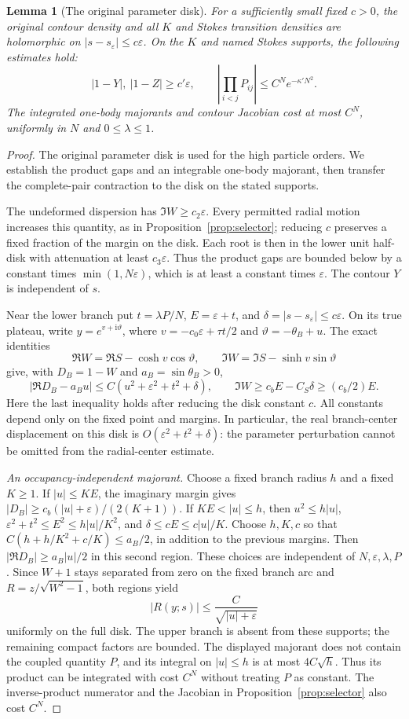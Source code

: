 \documentclass[11pt]{article}
\numberwithin{equation}{section}
\newtheorem{lemma}[theorem]{Lemma}
\theoremstyle{definition}
\newcommand{\ii}{\mathrm i}
\newcommand{\eps}{\varepsilon}
\newcommand{\se}{s_\varepsilon}
\begin{document}
\clearpage
\begin{lemma}[The original parameter disk]\label{lem:originaldisk}
For a sufficiently small fixed \(c>0\), the original contour
density and all \(K\) and Stokes transition densities are holomorphic
on \(|s-s_\eps|\le c\eps\). On the \(K\) and named Stokes
supports, the following estimates hold:
\[
 |1-Y|,\ |1-Z|\ge c'\eps,\qquad
 \left|\prod_{i<j}P_{ij}\right|\le C^Ne^{-\kappa' N^2}.
\]
The integrated one-body majorants and contour Jacobian cost
at most \(C^N\), uniformly in \(N\) and \(0\le\lambda\le1\).
\end{lemma}
\begin{proof}
The original parameter disk is used for the high particle orders. We establish the product gaps and an integrable one-body majorant, then transfer the complete-pair contraction to the disk on the stated supports.

The undeformed dispersion has \(\Im W\ge c_2\eps\).
Every permitted radial motion increases this quantity, as in
Proposition~\ref{prop:selector}; reducing \(c\) preserves a
fixed fraction of the margin on the disk. Each root is then
in the lower unit half-disk with attenuation at least \(c_3\eps\).
Thus the product gaps are bounded below by a constant times
\(\min(1,N\eps)\), which is at least a constant times \(\eps\).
The contour \(Y\) is independent of \(s\).

Near the lower branch put \(t=\lambda P/N\),
\(E=\eps+t\), and \(\delta=|s-\se|\le c\eps\).
On its true plateau, write
\(y=e^{v+\ii\vartheta}\), where
\(v=-c_0\eps+\tau t/2\) and \(\vartheta=-\theta_B+u\).
The exact identities
\[
 \Re W=\Re S-\cosh v\cos\vartheta,\qquad
 \Im W=\Im S-\sinh v\sin\vartheta
\]
give, with \(D_B=1-W\) and \(a_B=\sin\theta_B>0\),
\[
 |\Re D_B-a_Bu|
 \le C(u^2+\eps^2+t^2+\delta),\qquad
 \Im W\ge c_bE-C_S\delta\ge(c_b/2)E.
\]
Here the last inequality holds after reducing the disk constant
\(c\). All constants depend only on the fixed point and margins.
In particular, the real branch-center displacement on this disk is
\(O(\eps^2+t^2+\delta)\): the parameter perturbation cannot be
omitted from the radial-center estimate.

\smallskip\noindent\textit{An occupancy-independent majorant.}
Choose a fixed branch radius \(h\) and a fixed \(K\ge1\).
If \(|u|\le KE\), the imaginary margin gives
\(|D_B|\ge c_b(|u|+\eps)/(2(K+1))\).
If \(KE<|u|\le h\), then
\(u^2\le h|u|\), \(\eps^2+t^2\le E^2\le h|u|/K^2\),
and \(\delta\le cE\le c|u|/K\).
Choose \(h,K,c\) so that
\(C(h+h/K^2+c/K)\le a_B/2\), in addition to the previous margins.
Then \(|\Re D_B|\ge a_B|u|/2\) in this second region.
These choices are independent of \(N,\eps,\lambda,P\).
Since \(W+1\) stays separated from zero on the fixed branch arc
and \(R=z/\sqrt{W^2-1}\), both regions yield
\[
 |R(y;s)|\le \frac{C}{\sqrt{|u|+\eps}}
\]
uniformly on the full disk. The upper branch is absent from
these supports; the remaining compact factors are bounded.
The displayed majorant does not contain the coupled quantity
\(P\), and its integral on \(|u|\le h\) is at most \(4C\sqrt h\).
Thus its product can be integrated with cost \(C^N\) without
treating \(P\) as constant. The inverse-product numerator
and the Jacobian in Proposition~\ref{prop:selector} also cost \(C^N\).


\end{proof}
\end{document}
